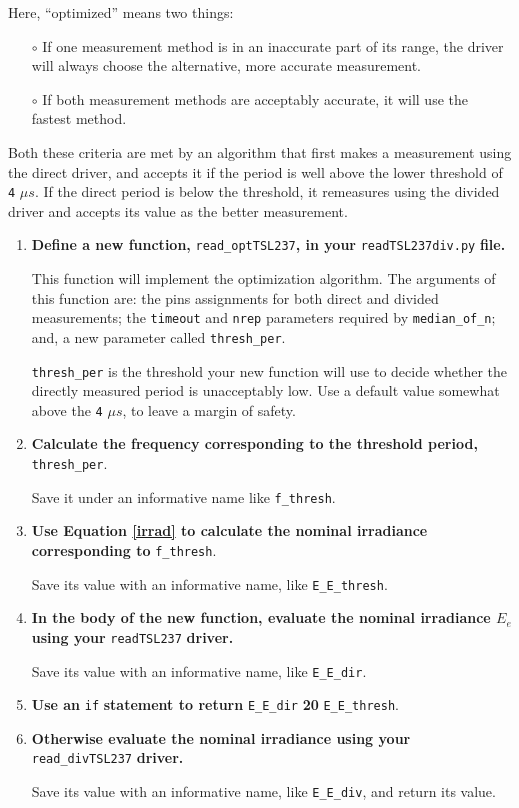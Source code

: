 Here, ``optimized'' means two things:
\begin{itemize}
	\item[$\circ$] If one measurement method is in an inaccurate part of its range, the driver will always choose the alternative, more accurate measurement.
	\item[$\circ$] If both measurement methods are acceptably accurate, it will use the fastest method.
\end{itemize}
Both these criteria are met by an algorithm that first makes a measurement using the direct driver, and accepts it if the period is well above the lower threshold of \texttt{4} $\mu s$.
If the direct period is below the threshold, it remeasures using the divided driver and accepts its value as the better measurement.
\begin{enumerate}
	\item \textbf{Define a new function,} \lstinline{read_optTSL237}\textbf{, in your} \lstinline{readTSL237div.py} \textbf{file.}

	This function will implement the optimization algorithm.
	The arguments of this function are: the pins assignments for both direct and divided measurements; the \lstinline{timeout} and \lstinline{nrep} parameters required by \lstinline{median_of_n}; and, a new parameter called \lstinline{thresh_per}.

	\smallskip
	\lstinline{thresh_per} is the threshold your new function will use to decide whether the directly measured period is unacceptably low.
	Use a default value somewhat above the  \texttt{4} $\mu s$, to leave a margin of safety.

	\item \textbf{Calculate the frequency corresponding to the threshold period,} \lstinline{thresh_per}.

	Save it under an informative name like \lstinline{f_thresh}.

	\item \textbf{Use Equation \ref{irrad} to calculate the nominal irradiance corresponding to} \lstinline{f_thresh}.

	Save its value with an informative name, like \lstinline{E_E_thresh}.

	\item \textbf{In the body of the new function, evaluate the nominal irradiance $E_e$ using your} \lstinline{readTSL237} \textbf{driver.}

	Save its value with an informative name, like \lstinline{E_E_dir}.

	\item \textbf{Use an} \lstinline{if} \textbf{statement to return} \lstinline{E_E_dir} \textbf{20} \lstinline{E_E_thresh}.

	\item \textbf{Otherwise evaluate the nominal irradiance using your} \lstinline{read_divTSL237} \textbf{driver.}

	Save its value with an informative name, like \lstinline{E_E_div}, and return its value.
\end{enumerate}

